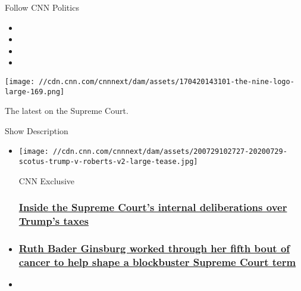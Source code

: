 Follow CNN Politics

\begin{itemize}
\item
\item
\item
\item
\end{itemize}

\texttt{[image: //cdn.cnn.com/cnnnext/dam/assets/170420143101-the-nine-logo-large-169.png]}

The latest on the Supreme Court.

Show Description

\begin{itemize}
\item
  \href{/2020/07/30/politics/supreme-court-trump-taxes-financial-documents/index.html}{}

  \texttt{[image: //cdn.cnn.com/cnnnext/dam/assets/200729102727-20200729-scotus-trump-v-roberts-v2-large-tease.jpg]}

  CNN Exclusive

  \hypertarget{inside-the-supreme-courts-internal-deliberations-over-trumps-taxes}{%
  \subsubsection{\texorpdfstring{\href{/2020/07/30/politics/supreme-court-trump-taxes-financial-documents/index.html}{Inside
  the Supreme Court's internal deliberations over Trump's
  taxes}}{Inside the Supreme Court's internal deliberations over Trump's taxes}}\label{inside-the-supreme-courts-internal-deliberations-over-trumps-taxes}}
\item
  \hypertarget{ruth-bader-ginsburg-worked-through-her-fifth-bout-of-cancer-to-help-shape-a-blockbuster-supreme-court-term}{%
  \subsubsection{\texorpdfstring{\href{/2020/08/01/politics/ruth-bader-ginsburg-cancer-2020-term-supreme-court/index.html}{Ruth
  Bader Ginsburg worked through her fifth bout of cancer to help shape a
  blockbuster Supreme Court
  term}}{Ruth Bader Ginsburg worked through her fifth bout of cancer to help shape a blockbuster Supreme Court term}}\label{ruth-bader-ginsburg-worked-through-her-fifth-bout-of-cancer-to-help-shape-a-blockbuster-supreme-court-term}}
\item
  \hypertarget{behind-closed-doors-during-one-of-john-roberts-most-surprising-years-on-the-court}{%
}
\end{itemize}
